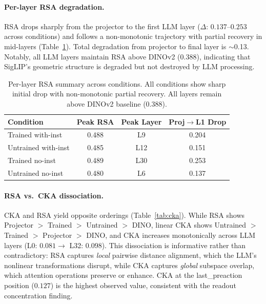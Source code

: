 \documentclass[letterpaper]{article}
\begin{document}
\paragraph{Per-layer RSA degradation.}
RSA drops sharply from the projector to the first LLM layer ($\Delta$: $0.137$--$0.253$ across conditions) and follows a non-monotonic trajectory with partial recovery in mid-layers (Table~\ref{tab:perlayer}).
Total degradation from projector to final layer is $\sim$0.13.
Notably, all LLM layers maintain RSA above DINOv2 ($0.388$), indicating that SigLIP's geometric structure is degraded but not destroyed by LLM processing.

\begin{table}[t]
\centering
\caption{Per-layer RSA summary across conditions. All conditions show sharp initial drop with non-monotonic partial recovery. All layers remain above DINOv2 baseline (0.388).}
\label{tab:perlayer}
\begin{tabular}{lccc}
\toprule
\textbf{Condition} & \textbf{Peak RSA} & \textbf{Peak Layer} & \textbf{Proj$\to$L1 Drop} \\
\midrule
Trained with-inst     & 0.488 & L9  & 0.204 \\
Untrained with-inst   & 0.485 & L12 & 0.151 \\
Trained no-inst       & 0.489 & L30 & 0.253 \\
Untrained no-inst     & 0.480 & L6  & 0.137 \\
\bottomrule
\end{tabular}
\end{table}

\paragraph{RSA vs.\ CKA dissociation.}
CKA and RSA yield opposite orderings (Table~\ref{tab:cka}).
While RSA shows Projector $>$ Trained $>$ Untrained $>$ DINO, linear CKA shows Untrained $>$ Trained $>$ Projector $>$ DINO, and CKA increases monotonically across LLM layers (L0: $0.081 \to$ L32: $0.098$).
This dissociation is informative rather than contradictory: RSA captures \emph{local} pairwise distance alignment, which the LLM's nonlinear transformations disrupt, while CKA captures \emph{global} subspace overlap, which attention operations preserve or enhance.
CKA at the last\_preaction position ($0.127$) is the highest observed value, consistent with the readout concentration finding.
\end{document}
